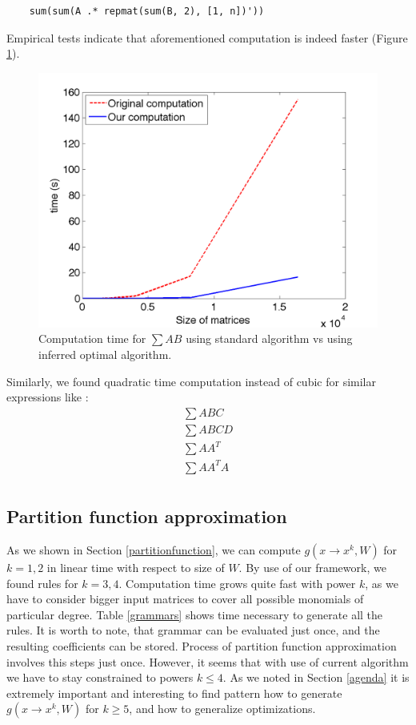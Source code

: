 \documentclass{article}
\begin{document}
\begin{verbatim}
	sum(sum(A .* repmat(sum(B, 2), [1, n])'))
\end{verbatim}

Empirical tests indicate that aforementioned computation is indeed faster (Figure \ref{ab}).

\begin{figure}[h]
\centering
\includegraphics[scale=0.3]{img/ab.png}
\caption{Computation time for $\sum AB$ using standard algorithm vs using inferred optimal algorithm.}
\label{ab}
\end{figure}


Similarly, we found quadratic time computation instead of cubic for similar expressions like : 
\begin{align*}
	\sum ABC\\
	\sum ABCD\\
	\sum AA^T\\
	\sum AA^TA\\
\end{align*}


\subsection{Partition function approximation}

As we shown in Section \ref{partitionfunction}, we can compute $g(x \rightarrow x^k, W)$ for $k = 1, 2$ in
linear time with respect to size of $W$. By use of
our framework, we found rules for $k = 3, 4$. Computation time grows quite fast with power $k$, as we have to consider 
bigger input matrices to cover all possible monomials of particular degree. Table \ref{grammars} shows time necessary to
generate all the rules. It is worth to note, that grammar can be evaluated just once, and the resulting coefficients can 
be stored. Process of partition function approximation involves this steps just once. However, it seems that 
with use of current algorithm we have to stay constrained to powers $k \leq 4$. As we noted in Section \ref{agenda}
it is extremely important and interesting to find pattern how to generate $g(x \rightarrow x^k, W)$ for $k \geq 5$, and
how to generalize optimizations. 
\end{document}
